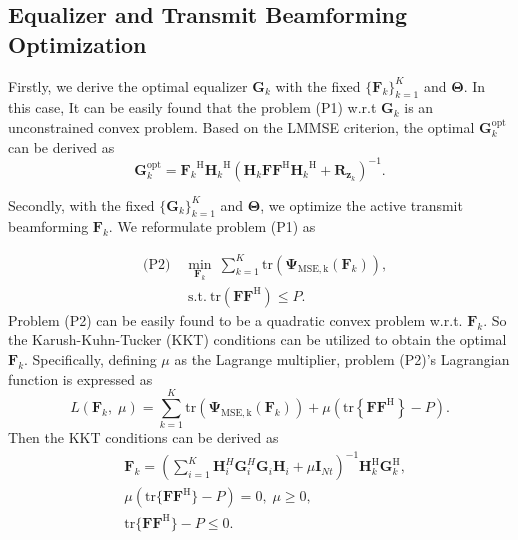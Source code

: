 \documentclass[journal]{IEEEtran}
\begin{document}
\vspace{-3mm}

\subsection{ Equalizer and Transmit Beamforming Optimization}
Firstly, we derive the optimal equalizer $\mathbf {G}_{k}$ with the fixed $\{ {\mathbf{F}}_{k} \}_{k=1}^{K}$ and $\mathbf {\Theta}$. In this case, It can be easily found that the problem (P1) w.r.t $\mathbf {G}_{k}$ is an unconstrained convex problem. Based on the LMMSE criterion, the optimal ${\mathbf{G}}_{k}^{\mathrm{ opt}} $ can be derived as
\begin{equation} {\mathbf{G}}_{k}^{\mathrm{ opt}} = {\mathbf{F}_{k}}^{\mathrm {H}}{\mathbf{H}_{k}}^{\mathrm {H}}({\mathbf{H}_{k}} {\mathbf{F}} {\mathbf{F}}^{\mathrm {H}}{\mathbf{H}_{k}}^{\mathrm {H}}+
     {\mathbf{R}}_{\mathbf{z}_{k}})^{-1}.\label{6}\end{equation}

Secondly, with the fixed $\{ {\mathbf{G}}_{k}\}_{k=1}^{K}$ and $\mathbf {\Theta}$, we optimize the  active transmit beamforming $\mathbf {F}_{k}$. We reformulate problem (P1)  as 

\vspace{-7mm}
\begin{subequations}\begin{align}&\text {(P2)} \quad \min _{\mathbf{ F}_{k}}~ \sum _{k = 1}^{K}{\mathrm {tr}} (\boldsymbol {\Psi }_{\mathrm{ MSE,k}} ({\mathbf{F}_{k}})),
    \\&\qquad \quad ~\text {s.t.}~{\mathrm {tr}} ( {\mathbf{F}} {\mathbf{F}}^{\mathrm {H}})\le P.
    \end{align} \end{subequations} 
 Problem (P2) can be easily found to be a quadratic convex problem
 w.r.t. $\mathbf {F}_{k}$. So the Karush-Kuhn-Tucker (KKT) conditions can be utilized to obtain the optimal $\mathbf {F}_{k}$. Specifically, defining $\mu$ as the Lagrange multiplier, problem (P2)'s  Lagrangian function is expressed as
\begin{equation} L ({{\mathbf{F}_{k}},\;\mu }) =\sum _{k = 1}^{K}{\mathrm {tr} (\boldsymbol {\Psi }_{\mathrm{ MSE,k}} ({\mathbf{F}_{k}})) }+ \mu (\mathrm {tr}\left \lbrace{ {\mathbf{F}} 
    {\mathbf{F}}^{\mathrm {H}}}\right \rbrace - P).\end{equation}
Then the KKT conditions can be derived as
\begin{subequations}\begin{align}&\mathbf {F}_{k} = (\sum _{i = 1}^{K}{\mathbf {H}_{i}^{H} \mathbf {G}_{i}^{H} \mathbf {G}_{i} \mathbf {H}_{i} + \mu \mathbf {I}_{Nt} })^{-1}  \mathbf {H}_{k}^{\mathrm{H}}\mathbf {G}_{k}^{\mathrm{H}},\label{9a}
    \\[2pt]&\mu ({\mathrm {tr} \lbrace{ {\mathbf{F}} {\mathbf{F}}^{\mathrm {H}}} \rbrace - P }) = 0,\;\mu \ge 0,\label{9b}
    \\[2pt]&\mathrm {tr} \lbrace{ {\mathbf{F}} {\mathbf{F}}^{\mathrm {H}}} \rbrace - P \le 0.\end{align}\end{subequations}
\end{document}
